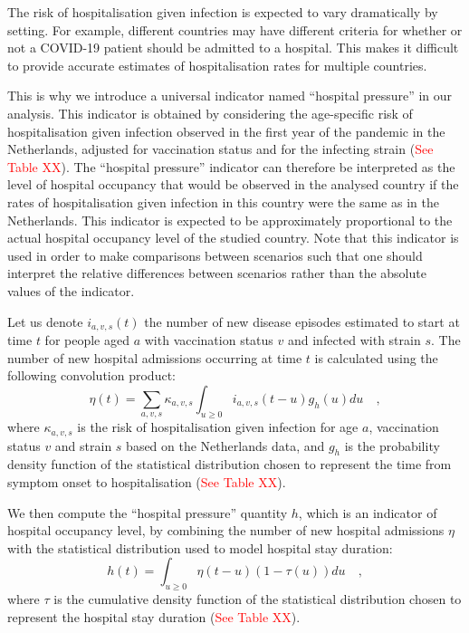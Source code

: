 The risk of hospitalisation given infection is expected to vary dramatically by setting.
For example, different countries may have different criteria for whether or not a COVID-19 
patient should be admitted to a hospital. This makes it difficult to provide accurate 
estimates of hospitalisation rates for multiple countries. 

This is why we introduce a universal indicator named ``hospital pressure'' in our analysis. This indicator
is obtained by considering the age-specific risk of hospitalisation given infection observed in the first year
of the pandemic in the Netherlands, adjusted for vaccination status and for the infecting strain (\textcolor{red}{See Table XX}).
The ``hospital pressure'' indicator can therefore be interpreted as the level of hospital occupancy that
would be observed in the analysed country if the rates of hospitalisation given infection in this country were the same
as in the Netherlands. This indicator is expected to be approximately proportional to the actual hospital occupancy level of the 
studied country. Note that this indicator is used in order to make comparisons between scenarios such that one should interpret the relative
differences between scenarios rather than the absolute values of the indicator. 

Let us denote $i_{a,v,s}(t)$ the number of new disease episodes estimated to start at time $t$ for people aged $a$ with vaccination status $v$
and infected with strain $s$. The number of new hospital admissions occurring at time $t$ is calculated using the following
convolution product:
\begin{equation}
 \eta(t) = \sum_{a,v,s} \kappa_{a,v,s} \int_{u \geq 0}  i_{a,v,s}(t-u)g_{h}(u) du   \quad,
 \end{equation}
where $\kappa_{a,v,s}$ is the risk of hospitalisation given infection for age $a$, vaccination status $v$ and strain $s$ 
based on the Netherlands data, and $g_h$ is the probability density function of the statistical distribution chosen to represent the 
time from symptom onset to hospitalisation (\textcolor{red}{See Table XX}). 

We then compute the ``hospital pressure'' quantity $h$, which is an indicator of hospital occupancy level, by combining the number of new 
hospital admissions $\eta$ with the statistical distribution used to model hospital stay duration:
\begin{equation}
h(t) = \int_{u \geq 0}  \eta(t-u) (1 - \tau(u)) du   \quad,
\end{equation}
where $\tau$ is the cumulative density function of the statistical distribution chosen to represent the 
hospital stay duration (\textcolor{red}{See Table XX}). 
